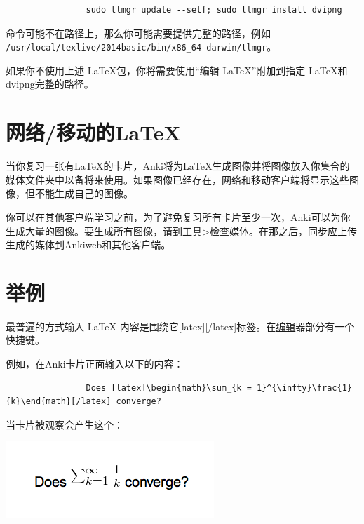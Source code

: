 \documentclass[a4paper]{book}
\begin{document}
			\begin{shaded}\begin{verbatim}
				sudo tlmgr update --self; sudo tlmgr install dvipng
				\end{verbatim}\end{shaded}
			命令可能不在路径上，那么你可能需要提供完整的路径，例如 \verb|/usr/local/texlive/2014basic/bin/x86_64-darwin/tlmgr|。
			
			
			\begin{shaded}
				如果你不使用上述 \LaTeX 包，你将需要使用“编辑 \LaTeX”附加到指定 \LaTeX 和dvipng完整的路径。
			\end{shaded}
			
			\section{网络/移动的LaTeX}
			
			当你复习一张有LaTeX的卡片，Anki将为LaTeX生成图像并将图像放入你集合的媒体文件夹中以备将来使用。如果图像已经存在，网络和移动客户端将显示这些图像，但不能生成自己的图像。
			
			你可以在其他客户端学习之前，为了避免复习所有卡片至少一次，Anki可以为你生成大量的图像。要生成所有图像，请到工具>检查媒体。在那之后，同步应上传生成的媒体到Ankiweb和其他客户端。
			
			\section{举例}
			
			最普遍的方式输入 LaTeX 内容是围绕它[latex][/latex]标签。在\hyperref[editor]{编辑}器部分有一个快捷键。
			
			例如，在Anki卡片正面输入以下的内容：
			
			\begin{shaded}\begin{verbatim}
				Does [latex]\begin{math}\sum_{k = 1}^{\infty}\frac{1}{k}\end{math}[/latex] converge?
				\end{verbatim}\end{shaded}
			
			当卡片被观察会产生这个：
			
			\includegraphics{figures/convergence-question.png}
			
\end{document}
